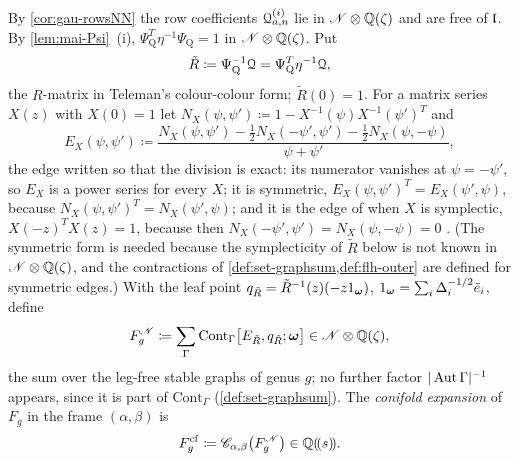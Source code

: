 \begin{defn}
\label{def:mai-Fcf}
By \cref{cor:gau-rowsNN} the row coefficients $\mathcal{Q}^{(i)}_{a,n}$ lie in $\mathscr{N}\otimes\mathbb{Q}(\zeta)$ and are free of $\mathfrak{l}$. By \cref{lem:mai-Psi}~(i), $\Psi_{\mathrm Q}^T\eta^{-1}\Psi_{\mathrm Q}=1$ in $\mathscr{N}\otimes\mathbb{Q}(\zeta)$. Put
\[
\tilde R\coloneqq\Psi_{\mathrm Q}^{-1}\mathcal{Q}=\Psi_{\mathrm Q}^T\eta^{-1}\mathcal{Q} ,
\]
the $R$-matrix in Teleman's colour-colour form; $\tilde R(0)=1$. For a matrix series $X(z)$ with $X(0)=1$ let $N_X(\psi,\psi')\coloneqq1-X^{-1}(\psi)X^{-1}(\psi')^T$ and
\[
E_X(\psi,\psi')\coloneqq\frac{N_X(\psi,\psi')-\frac12N_X(-\psi',\psi')-\frac12N_X(\psi,-\psi)}{\psi+\psi'} ,
\]
the edge written so that the division is exact: its numerator vanishes at $\psi=-\psi'$, so $E_X$ is a power series for every $X$; it is symmetric, $E_X(\psi,\psi')^T=E_X(\psi',\psi)$, because $N_X(\psi,\psi')^T=N_X(\psi',\psi)$; and it is the edge of \cite[Def.~2.2]{PPZ15} when $X$ is symplectic, $X(-z)^TX(z)=1$, because then $N_X(-\psi',\psi')=N_X(\psi,-\psi)=0$ \cite[Rem.~2.1]{PPZ15}. (The symmetric form is needed because the symplecticity of $\tilde R$ below is not known in $\mathscr{N}\otimes\mathbb{Q}(\zeta)$, and the contractions of \cref{def:set-graphsum,def:flh-outer} are defined for symmetric edges.) With the leaf point $q_{\tilde R}=\tilde R^{-1}(z)(-z1_{\boldsymbol{\omega}})$, $1_{\boldsymbol{\omega}}=\sum_i\Delta_i^{-1/2}\tilde e_i$, define
\[
F_g^{\mathscr{N}}\coloneqq\sum_\Gamma\mathrm{Cont}_\Gamma\bigl[E_{\tilde R},q_{\tilde R};\boldsymbol{\omega}\bigr]\in\mathscr{N}\otimes\mathbb{Q}(\zeta),
\]
the sum over the leg-free stable graphs of genus $g$; no further factor $|\operatorname{Aut}\Gamma|^{-1}$ appears, since it is part of $\mathrm{Cont}_\Gamma$ (\cref{def:set-graphsum}). The \emph{conifold expansion} of $F_g$ in the frame $(\alpha,\beta)$ is
\[
F_g^{\mathrm{cf}}\coloneqq\mathscr{C}_{\alpha,\beta}\bigl(F_g^{\mathscr{N}}\bigr)\in\mathbb{Q}(\!(s)\!).
\]
\end{defn}

